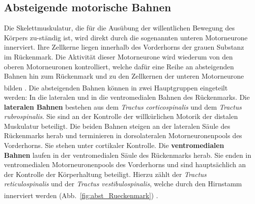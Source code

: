 \subsection{Absteigende motorische Bahnen}
Die Skelettmuskulatur, die für die Ausübung der willentlichen Bewegung des Körpers zu-ständig ist, wird direkt durch die sogenannten unteren Motorneurone innerviert. Ihre Zellkerne liegen innerhalb des Vorderhorns der grauen Substanz im Rückenmark. Die Aktivität dieser Motorneurone wird wiederum von den oberen Motorneuronen kontrolliert, welche dafür eine Reihe an absteigenden Bahnen hin zum Rückenmark und zu den Zellkernen der unteren Motorneurone bilden \textsuperscript{\cite[Kap.~1]{crossman2014neuroanatomy}}. Die absteigenden Bahnen können in zwei Hauptgruppen eingeteilt werden: In die lateralen und in die ventromedialen Bahnen des Rückenmarks. Die \textbf{lateralen Bahnen} bestehen aus dem \textit{Tractus corticospinalis} und dem \textit{Tractus rubrospinalis}. Sie sind an der Kontrolle der willkürlichen Motorik der distalen Muskulatur beteiligt. Die beiden Bahnen steigen an der lateralen Säule des Rückenmarks herab und terminieren in dorsolateralen Motorneuronenpools des Vorderhorns. Sie stehen unter cortikaler Kontrolle. Die \textbf{ventromedialen Bahnen} laufen in der ventromedialen Säule des Rückenmarks herab. Sie enden in ventromedialen Motorneuronenpools des Vorderhorns und sind hauptsächlich an der Kontrolle der Körperhaltung beteiligt. Hierzu zählt der \textit{Tractus reticulospinalis} und der \textit{Tractus vestibulospinalis}, welche durch den Hirnstamm innerviert werden (Abb.~\ref{fig:abst_Rueckenmark}) \textsuperscript{\cite[14]{neurowissenschaften_baer}}. 


